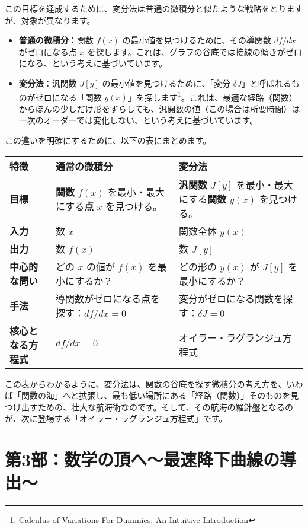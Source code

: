 \documentclass[a4paper,12pt]{bxjsarticle}
\begin{document}
この目標を達成するために、変分法は普通の微積分と似たような戦略をとりますが、対象が異なります。

\begin{itemize}
\item \textbf{普通の微積分}：関数 $f(x)$ の最小値を見つけるために、その導関数 $df/dx$ がゼロになる点 $x$ を探します。これは、グラフの谷底では接線の傾きがゼロになる、という考えに基づいています。

\item \textbf{変分法}：汎関数 $J[y]$ の最小値を見つけるために、「変分 $\delta J$」と呼ばれるものがゼロになる「関数 $y(x)$」を探します\footnote{Calculus of Variations For Dummies: An Intuitive Introduction}。これは、最適な経路（関数）からほんの少しだけ形をずらしても、汎関数の値（この場合は所要時間）は一次のオーダーでは変化しない、という考えに基づいています。
\end{itemize}

この違いを明確にするために、以下の表にまとめます。

\begin{longtable}{|p{3cm}|p{5cm}|p{5cm}|}
\hline
\textbf{特徴} & \textbf{通常の微積分} & \textbf{変分法} \\
\hline
\textbf{目標} & \textbf{関数} $f(x)$ を最小・最大にする\textbf{点} $x$ を見つける。 & \textbf{汎関数} $J[y]$ を最小・最大にする\textbf{関数} $y(x)$ を見つける。 \\
\hline
\textbf{入力} & 数 $x$ & 関数全体 $y(x)$ \\
\hline
\textbf{出力} & 数 $f(x)$ & 数 $J[y]$ \\
\hline
\textbf{中心的な問い} & どの $x$ の値が $f(x)$ を最小にするか？ & どの形の $y(x)$ が $J[y]$ を最小にするか？ \\
\hline
\textbf{手法} & 導関数がゼロになる点を探す：$df/dx=0$ & 変分がゼロになる関数を探す：$\delta J=0$ \\
\hline
\textbf{核心となる方程式} & $df/dx=0$ & オイラー・ラグランジュ方程式 \\
\hline
\end{longtable}

この表からわかるように、変分法は、関数の谷底を探す微積分の考え方を、いわば「関数の海」へと拡張し、最も低い場所にある「経路（関数）」そのものを見つけ出すための、壮大な航海術なのです。そして、その航海の羅針盤となるのが、次に登場する「オイラー・ラグランジュ方程式」です。

\section{第3部：数学の頂へ〜最速降下曲線の導出〜}
\end{document}
